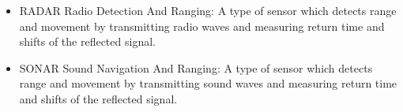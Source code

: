 \begin{itemize}
\item RADAR Radio Detection And Ranging: A type of sensor which detects range and movement by transmitting 
radio waves and measuring return time and shifts of the reflected signal.
\end{itemize}

\begin{itemize}
\item SONAR Sound Navigation And Ranging: A type of sensor which detects range and movement by transmitting sound waves and measuring return time and shifts of the reflected signal. 
\end{itemize}